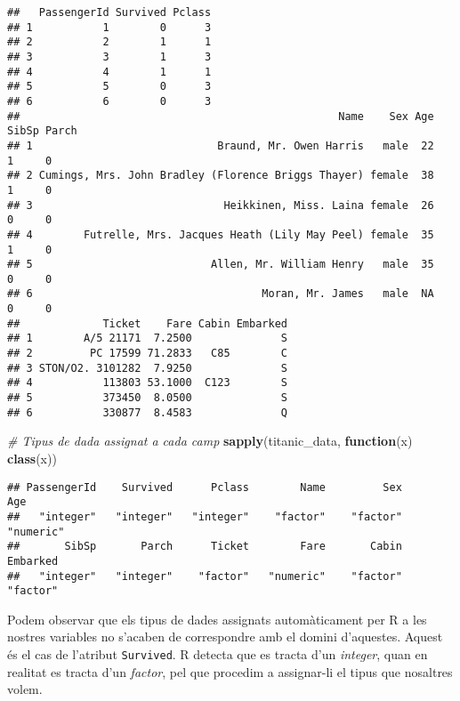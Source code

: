 \documentclass[]{article}
\newenvironment{Shaded}{\begin{snugshade}}{\end{snugshade}}
\newcommand{\CommentTok}[1]{\textcolor[rgb]{0.56,0.35,0.01}{\textit{#1}}}
\newcommand{\ControlFlowTok}[1]{\textcolor[rgb]{0.13,0.29,0.53}{\textbf{#1}}}
\newcommand{\KeywordTok}[1]{\textcolor[rgb]{0.13,0.29,0.53}{\textbf{#1}}}
\newcommand{\NormalTok}[1]{#1}
\newcommand{\OperatorTok}[1]{\textcolor[rgb]{0.81,0.36,0.00}{\textbf{#1}}}
\newcommand{\StringTok}[1]{\textcolor[rgb]{0.31,0.60,0.02}{#1}}
\begin{document}
\begin{verbatim}
##   PassengerId Survived Pclass
## 1           1        0      3
## 2           2        1      1
## 3           3        1      3
## 4           4        1      1
## 5           5        0      3
## 6           6        0      3
##                                                  Name    Sex Age SibSp Parch
## 1                             Braund, Mr. Owen Harris   male  22     1     0
## 2 Cumings, Mrs. John Bradley (Florence Briggs Thayer) female  38     1     0
## 3                              Heikkinen, Miss. Laina female  26     0     0
## 4        Futrelle, Mrs. Jacques Heath (Lily May Peel) female  35     1     0
## 5                            Allen, Mr. William Henry   male  35     0     0
## 6                                    Moran, Mr. James   male  NA     0     0
##             Ticket    Fare Cabin Embarked
## 1        A/5 21171  7.2500              S
## 2         PC 17599 71.2833   C85        C
## 3 STON/O2. 3101282  7.9250              S
## 4           113803 53.1000  C123        S
## 5           373450  8.0500              S
## 6           330877  8.4583              Q
\end{verbatim}

\begin{Shaded}
\begin{Highlighting}[]
\CommentTok{# Tipus de dada assignat a cada camp}
\KeywordTok{sapply}\NormalTok{(titanic_data, }\ControlFlowTok{function}\NormalTok{(x) }\KeywordTok{class}\NormalTok{(x))}
\end{Highlighting}
\end{Shaded}

\begin{verbatim}
## PassengerId    Survived      Pclass        Name         Sex         Age 
##   "integer"   "integer"   "integer"    "factor"    "factor"   "numeric" 
##       SibSp       Parch      Ticket        Fare       Cabin    Embarked 
##   "integer"   "integer"    "factor"   "numeric"    "factor"    "factor"
\end{verbatim}

Podem observar que els tipus de dades assignats automàticament per R a
les nostres variables no s'acaben de correspondre amb el domini
d'aquestes. Aquest és el cas de l'atribut \texttt{Survived}. R detecta
que es tracta d'un \emph{integer}, quan en realitat es tracta d'un
\emph{factor}, pel que procedim a assignar-li el tipus que nosaltres
volem.

\begin{Shaded}
\end{Shaded}
\end{document}
